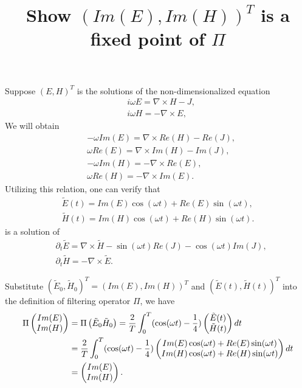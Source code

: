 \documentclass[10pt]{article}
\begin{document}
\title{Show $(Im(E),Im(H))^T$ is a fixed point of $\Pi$}
\maketitle
Suppose $(E,H)^T$ is the solutions of the non-dimensionalized equation
\begin{align}
&i\omega E = \nabla\times H-J,\\
&i\omega H = -\nabla\times E,
\end{align}
We will obtain 
\begin{align}
&-\omega Im(E) = \nabla\times Re(H)-Re(J), \\
& \omega Re(E) = \nabla\times Im(H)-Im(J), \\
&-\omega Im(H) = -\nabla\times Re(E), \\
&\omega  Re(H) = -\nabla\times Im(E). 
\end{align}
Utilizing this relation, one can verify that 
\begin{align}
\tilde{E}(t) = Im(E) \cos(\omega t) + Re(E) \sin(\omega t), \\
\tilde{H}(t) = Im(H) \cos (\omega t) + Re(H) \sin (\omega t).
\end{align}
is a solution of
\begin{align}
&\partial_t \tilde{E} =  \nabla\times \tilde{H}- \sin(\omega t)Re(J)-\cos(\omega t) Im(J),\\
&\partial_t \tilde{H} = -\nabla\times \tilde{E}.
\end{align}


Substitute $( \tilde{E}_0,\tilde{H}_0)^T=(Im(E),Im(H))^T$ and $( \tilde{E}(t),\tilde{H}(t) )^T$ into the definition of filtering operator $\Pi$, we have
\begin{align}
\Pi \left(\begin{matrix}
Im(E)\\
Im(H)
\end{matrix}\right)&=
\Pi \left(\begin{matrix}
\tilde{E}_0
\tilde{H}_0
\end{matrix}\right)
=  \frac{2}{T}\int_{0}^T 
(\cos(\omega t)-\frac{1}{4})
\left(\begin{matrix}
\tilde{E}(t)\\
\tilde{H}(t)
\end{matrix}\right)dt\notag\\
&=\frac{2}{T}\int_{0}^T 
(\cos(\omega t)-\frac{1}{4})
\left(\begin{matrix}
Im(E) \cos(\omega t) + Re(E) \sin(\omega t)\\
Im(H) \cos (\omega t) + Re(H) \sin (\omega t)
\end{matrix}\right)dt\notag\\
&=\left(\begin{matrix}
Im(E)\\
Im(H)
\end{matrix}\right).
\end{align}
\end{document}
